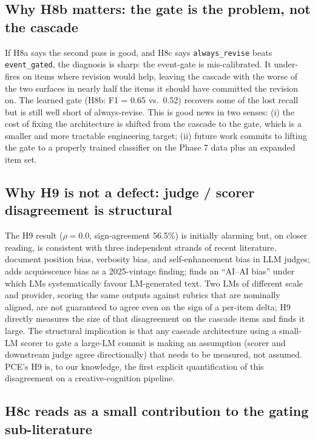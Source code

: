 \subsection{Why H8b matters: the gate is the problem, not the cascade}

If H8a says the second pass is good, and H8c says \texttt{always\_revise} beats \texttt{event\_gated}, the diagnosis is sharp: the  event-gate is mis-calibrated. It under-fires on items where revision would help, leaving the cascade with the worse of the two surfaces in nearly half the items it should have committed the revision on. The learned gate (H8b: F1 = 0.65 vs.\ 0.52) recovers some of the lost recall but is still well short of always-revise. This is good news in two senses: (i) the cost of fixing the architecture is shifted from the cascade to the gate, which is a smaller and more tractable engineering target; (ii) future work commits to lifting the gate to a properly trained classifier on the Phase 7 data plus an expanded item set.

\subsection{Why H9 is not a defect: judge / scorer disagreement is structural}

The H9 result ($\rho=0.0$, sign-agreement 56.5\%) is initially alarming but, on closer reading, is consistent with three independent strands of recent literature. \citet{ZhengEtAl2023JudgingLLMAsJudge} document position bias, verbosity bias, and self-enhancement bias in LLM judges; \citet{Braun2025AcquiescenceBiasLLMs} adds acquiescence bias as a 2025-vintage finding; \citet{LauritoEtAl2025PNASAIAIBias} finds an ``AI--AI bias'' under which LMs systematically favour LM-generated text. Two LMs of different scale and provider, scoring the same outputs against rubrics that are nominally aligned, are not guaranteed to agree even on the sign of a per-item delta; H9 directly measures the size of that disagreement on the cascade items and finds it large. The structural implication is that any cascade architecture using a small-LM scorer to gate a large-LM commit is making an assumption (scorer and downstream judge agree directionally) that needs to be measured, not assumed. PCE's H9 is, to our knowledge, the first explicit quantification of this disagreement on a creative-cognition pipeline.

\subsection{H8c reads as a small contribution to the gating sub-literature}

